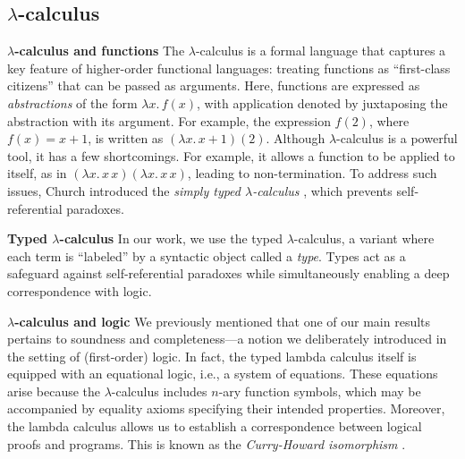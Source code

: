


\subsection*{ $\lambda$-calculus}
\noindent \textbf{$\lambda$-calculus and functions}
The $\lambda$-calculus is a formal language that captures a key feature of higher-order functional languages: treating functions as ``first-class citizens'' that can be passed as arguments. Here, functions are expressed as \emph{abstractions} of the form $\lambda x.\,f(x)$, with application denoted by juxtaposing the abstraction with its argument. For example, the expression $f(2)$, where $f(x) = x + 1$, is written as $(\lambda x.\,x + 1)(2)$. 
Although $\lambda$-calculus is a powerful tool, it has a few shortcomings. For example, it allows a function to be applied to itself, as in $(\lambda x.\,x\,x)(\lambda x.\,x\,x)$, leading to non-termination. To address such issues, Church introduced the \emph{simply typed $\lambda$-calculus} \cite{churchFormulationSimpleTheory1940}, which prevents self-referential paradoxes.


\noindent \textbf{Typed $\lambda$-calculus}
In our work, we use the typed $\lambda$-calculus, a variant where each term is ``labeled'' by a syntactic object called a \emph{type}. Types act as a safeguard against self-referential paradoxes while simultaneously enabling a deep correspondence with logic.


\noindent \textbf{$\lambda$-calculus and logic} 
We previously mentioned that one of our main results pertains to soundness and completeness---a notion we deliberately introduced in the setting of (first-order) logic. In fact, the typed lambda calculus itself is equipped with an equational logic, i.e., a system of equations. These equations arise because the $\lambda$-calculus includes $n$-ary function symbols, which may be accompanied by equality axioms specifying their intended properties. Moreover, the lambda calculus allows us to establish a correspondence between logical proofs and programs. This is known as the \emph{Curry-Howard isomorphism} \cite{girardProofsTypes1989}.

 


